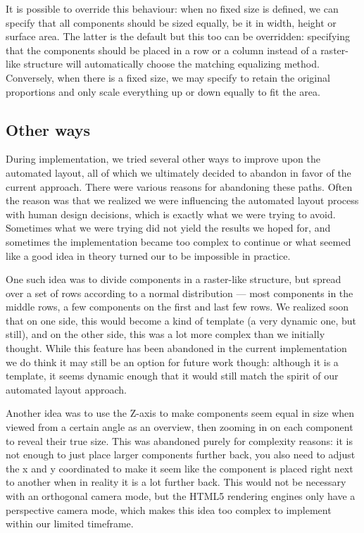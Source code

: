     It is possible to override this behaviour: when no fixed size is defined,
    we can specify that all components should be sized equally, be it in width,
    height or surface area. The latter is the default but this too can be
    overridden: specifying that the components should be placed in a row or a
    column instead of a raster-like structure will automatically choose the
    matching equalizing method. Conversely, when there is a fixed size, we may
    specify to retain the original proportions and only scale everything up or
    down equally to fit the area.
   
   \subsection{Other ways}

    During implementation, we tried several other ways to improve upon the
    automated layout, all of which we ultimately decided to abandon in favor of
    the current approach. There were various reasons for abandoning these
    paths. Often the reason was that we realized we were influencing the
    automated layout process with human design decisions, which is exactly what
    we were trying to avoid. Sometimes what we were trying did not yield the
    results we hoped for, and sometimes the implementation became too complex
    to continue or what seemed like a good idea in theory turned our to be
    impossible in practice.

    One such idea was to divide components in a raster-like structure, but
    spread over a set of rows according to a normal distribution --- most
    components in the middle rows, a few components on the first and last few
    rows. We realized soon that on one side, this would become a kind of
    template (a very dynamic one, but still), and on the other side, this was a
    lot more complex than we initially thought. While this feature has been
    abandoned in the current implementation we do think it may still be an
    option for future work though: although it is a template, it seems dynamic
    enough that it would still match the spirit of our automated layout
    approach.

    Another idea was to use the Z-axis to make components seem equal in size
    when viewed from a certain angle as an overview, then zooming in on each
    component to reveal their true size. This was abandoned purely for
    complexity reasons: it is not enough to just place larger components
    further back, you also need to adjust the x and y coordinated to make it
    seem like the component is placed right next to another when in reality it
    is a lot further back. This would not be necessary with an orthogonal
    camera mode, but the HTML5 rendering engines only have a perspective camera
    mode, which makes this idea too complex to implement within our limited
    timeframe.
